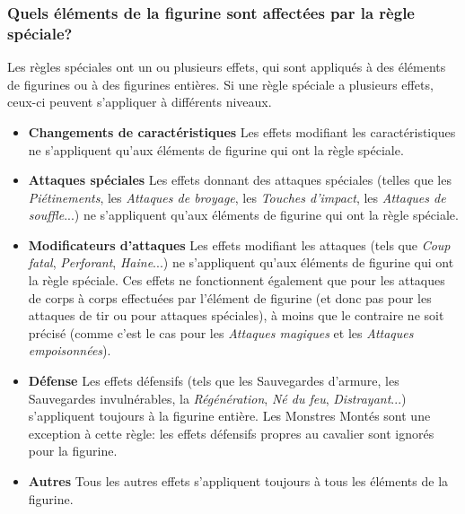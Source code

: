 \subsubsection*{Quels éléments de la figurine sont affectées par la règle spéciale?}

Les règles spéciales ont un ou plusieurs effets, qui sont appliqués à des éléments de figurines ou à des figurines entières. Si une règle spéciale a plusieurs effets, ceux-ci peuvent s'appliquer à différents niveaux.

\begin{itemize}
\item \textbf{Changements de caractéristiques}
\newline Les effets modifiant les caractéristiques ne s'appliquent qu'aux éléments de figurine qui ont la règle spéciale.
\item \textbf{Attaques spéciales}
\newline Les effets donnant des attaques spéciales (telles que les \emph{Piétinements}, les \emph{Attaques de broyage}, les \emph{Touches d'impact}, les \emph{Attaques de souffle}...) ne s'appliquent qu'aux éléments de figurine qui ont la règle spéciale.
\item \textbf{Modificateurs d'attaques}
\newline Les effets modifiant les attaques (tels que \emph{Coup fatal}, \emph{Perforant}, \emph{Haine}...) ne s'appliquent qu'aux éléments de figurine qui ont la règle spéciale. Ces effets ne fonctionnent également que pour les attaques de corps à corps effectuées par l'élément de figurine (et donc pas pour les attaques de tir ou pour attaques spéciales), à moins que le contraire ne soit précisé (comme c'est le cas pour les \emph{Attaques magiques} et les \emph{Attaques empoisonnées}).
\item \textbf{Défense}
\newline Les effets défensifs (tels que les Sauvegardes d'armure, les Sauvegardes invulnérables, la \emph{Régénération}, \emph{Né du feu}, \emph{Distrayant}...) s'appliquent toujours à la figurine entière.
\newline Les Monstres Montés sont une exception à cette règle: les effets défensifs propres au cavalier sont ignorés pour la figurine.
\item \textbf{Autres}
\newline Tous les autres effets s'appliquent toujours à tous les éléments de la figurine.
\end{itemize}

